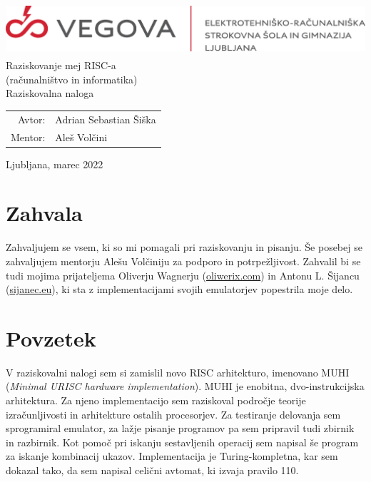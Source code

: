 \documentclass[12pt]{article}
\begin{document}
\linespread{1.25}
\begin{titlepage}
  \begin{center}
    \includegraphics[height=2cm]{slike/vegova.png}\\
    \Huge
    \vspace*{6cm}
    Raziskovanje mej RISC-a\\
    \Large
    (računalništvo in informatika)\\
    Raziskovalna naloga\\
  \end{center}
  \vspace{8cm}
  \begin{tabular}{rl}
    Avtor: & Adrian Sebastian Šiška\\
    Mentor: & Aleš Volčini
  \end{tabular}
  \vspace{1cm}
  \begin{center}
    Ljubljana, marec 2022
  \end{center}
\end{titlepage}

\pagebreak
{}

\tableofcontents

\pagebreak

\listoffigures

\pagebreak

\section{Zahvala}
Zahvaljujem se vsem, ki so mi pomagali pri raziskovanju in pisanju.
Še posebej se zahvaljujem mentorju Alešu Volčiniju za podporo in potrpežljivost.
Zahvalil bi se tudi mojima prijateljema Oliverju Wagnerju (\url{oliwerix.com}) in Antonu L. Šijancu (\url{sijanec.eu}), ki sta z implementacijami svojih emulatorjev popestrila moje delo.

\pagebreak

\section{Povzetek}
V raziskovalni nalogi sem si zamislil novo RISC arhitekturo, imenovano MUHI (\textit{Minimal URISC hardware implementation}).
MUHI je enobitna, dvo-instrukcijska arhitektura.
Za njeno implementacijo sem raziskoval področje teorije izračunljivosti in arhitekture ostalih procesorjev.
Za testiranje delovanja sem sprogramiral emulator, za lažje pisanje programov pa sem pripravil tudi zbirnik in razbirnik.
Kot pomoč pri iskanju sestavljenih operacij sem napisal še program za iskanje kombinacij ukazov.
Implementacija je Turing-kompletna, kar sem dokazal tako, da sem napisal celični avtomat, ki izvaja pravilo 110.
\end{document}
